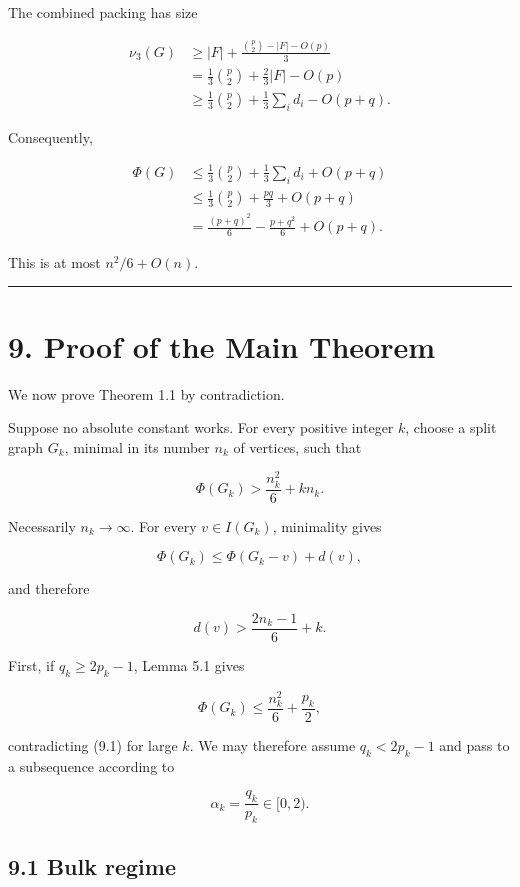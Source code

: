 \documentclass[
  11pt,
]{article}
\begin{document}
The combined packing has size

\[
\begin{aligned}
\nu_3(G)
&\ge
|F|+\frac{\binom p2-|F|-O(p)}3\\
&=
\frac13\binom p2+\frac23|F|-O(p)\\
&\ge
\frac13\binom p2+\frac13\sum_i d_i-O(p+q).
\end{aligned}
\tag{8.10}
\]

Consequently,

\[
\begin{aligned}
\Phi(G)
&\le
\frac13\binom p2+\frac13\sum_i d_i+O(p+q)\\
&\le
\frac13\binom p2+\frac{pq}{3}+O(p+q)\\
&=
\frac{(p+q)^2}{6}-\frac{p+q^2}{6}+O(p+q).
\end{aligned}
\tag{8.11}
\]

This is at most \(n^2/6+O(n)\).

\begin{center}\rule{0.5\linewidth}{0.5pt}\end{center}

\section{9. Proof of the Main Theorem}\label{proof-of-the-main-theorem}

We now prove Theorem 1.1 by contradiction.

Suppose no absolute constant works. For every positive integer \(k\),
choose a split graph \(G_k\), minimal in its number \(n_k\) of vertices,
such that

\[
\Phi(G_k)
>
\frac{n_k^2}{6}+kn_k.
\tag{9.1}
\]

Necessarily \(n_k\to\infty\). For every \(v\in I(G_k)\), minimality
gives

\[
\Phi(G_k)
\le
\Phi(G_k-v)+d(v),
\]

and therefore

\[
\boxed{
d(v)>
\frac{2n_k-1}{6}+k.
}
\tag{9.2}
\]

First, if \(q_k\ge2p_k-1\), Lemma 5.1 gives

\[
\Phi(G_k)
\le
\frac{n_k^2}{6}+\frac{p_k}{2},
\]

contradicting (9.1) for large \(k\). We may therefore assume
\(q_k<2p_k-1\) and pass to a subsequence according to

\[
\alpha_k=\frac{q_k}{p_k}\in[0,2).
\]

\subsection{9.1 Bulk regime}\label{bulk-regime}
\end{document}
